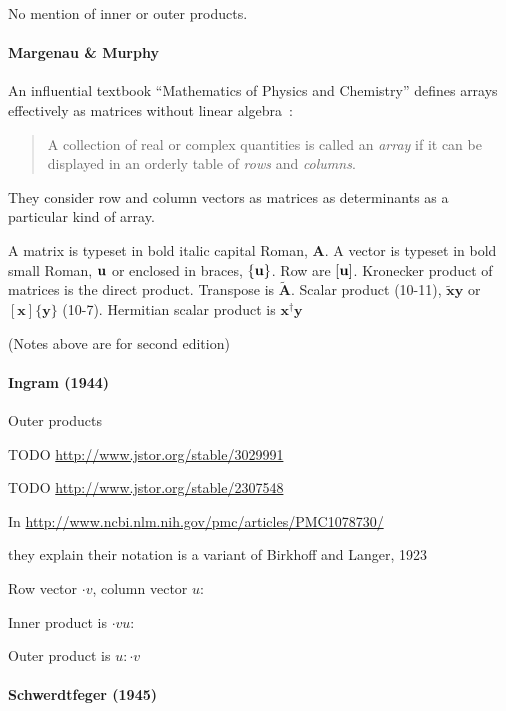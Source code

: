No mention of inner or outer products.


\paragraph{Margenau \& Murphy~\cite{Margenau1943}}

An influential textbook ``Mathematics of Physics and Chemistry'' defines arrays
effectively as matrices without linear algebra~\cite[\S 10.1, p. 288]{Margenau1943}:

\begin{quote}
A collection of real or complex quantities is called an
\textit{array} if it can be displayed in an orderly table of \textit{rows} and \textit{columns}.
\end{quote}

They consider row and column vectors as matrices as determinants as a particular kind of array.

A matrix is typeset in bold italic capital Roman, $\boldsymbol A$.
A vector is typeset in bold small Roman, $\textbf u$ or enclosed in braces, $\{ \textbf u \}$.
Row are $[\textbf u ]$.
Kronecker product of matrices is the direct product.
Transpose is $\tilde{\boldsymbol A}$.
Scalar product (10-11), $\tilde{\mathbf x} \mathbf y$ or $[\mathbf x] \{\mathbf y\}$ (10-7).
Hermitian scalar product is $\mathbf x^\dagger \mathbf y$



(Notes above are for second edition)



\paragraph{Ingram (1944)}

Outer products

TODO \url{http://www.jstor.org/stable/3029991}

TODO \url{http://www.jstor.org/stable/2307548}

In
\url{http://www.ncbi.nlm.nih.gov/pmc/articles/PMC1078730/}

they explain their notation is a variant of Birkhoff and Langer, 1923

Row vector $\cdot v$, column vector $u:$

Inner product is $\cdot v u:$

Outer product is $u:\cdot v$



\paragraph{Schwerdtfeger (1945)}

